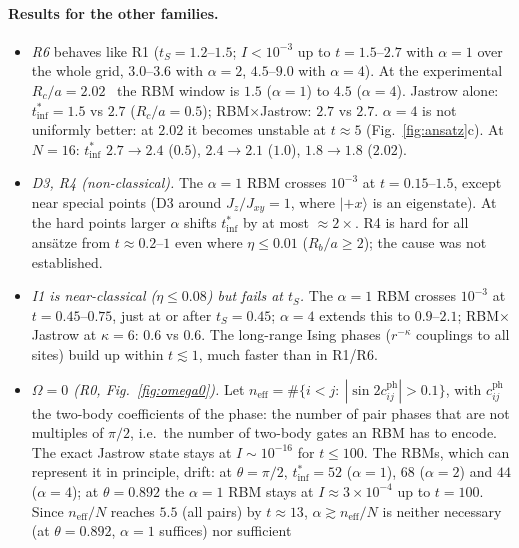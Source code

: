 \documentclass[11pt,a4paper]{article}
\newcommand{\inff}{I}
\newcommand{\tinf}{t^*_{\mathrm{inf}}}
\begin{document}
\paragraph{Results for the other families.}
\begin{itemize}
  \item \emph{R6} behaves like R1 ($t_S=1.2$--$1.5$; $\inff<10^{-3}$ up to $t=1.5$--$2.7$ with $\alpha=1$ over the
    whole grid, $3.0$--$3.6$ with $\alpha=2$, $4.5$--$9.0$ with $\alpha=4$). At the experimental
    $R_c/a=2.02$~\cite{Zeiher16} the RBM window is $1.5$ ($\alpha=1$) to $4.5$ ($\alpha=4$). Jastrow alone: $\tinf=1.5$
    vs $2.7$ ($R_c/a=0.5$); RBM$\times$Jastrow: $2.7$ vs $2.7$. $\alpha=4$ is not uniformly better: at $2.02$ it
    becomes unstable at $t\approx5$ (Fig.~\ref{fig:ansatz}c). At $N=16$: $\tinf$ $2.7\to2.4$ ($0.5$), $2.4\to2.1$
    ($1.0$), $1.8\to1.8$ ($2.02$).
  \item \emph{D3, R4 (non-classical).} The $\alpha=1$ RBM crosses $10^{-3}$ at $t=0.15$--$1.5$, except near special
    points (D3 around $J_z/J_{xy}=1$, where $|{+}x\rangle$ is an eigenstate). At the hard points larger $\alpha$ shifts
    $\tinf$ by at most $\approx2\times$. R4 is hard for all ansätze from $t\approx0.2$--$1$ even where $\eta\le0.01$
    ($R_b/a\ge2$); the cause was not established.
  \item \emph{I1 is near-classical ($\eta\le0.08$) but fails at $t_S$.} The $\alpha=1$ RBM crosses $10^{-3}$ at
    $t=0.45$--$0.75$, just at or after $t_S=0.45$; $\alpha=4$ extends this to $0.9$--$2.1$; RBM$\times$Jastrow at
    $\kappa=6$: $0.6$ vs $0.6$. The long-range Ising phases ($r^{-\kappa}$ couplings to all sites) build up within
    $t\lesssim1$, much faster than in R1/R6.
  \item \emph{$\Omega=0$ (R0, Fig.~\ref{fig:omega0}).} Let $n_{\mathrm{eff}}=\#\{i<j:\ |\sin2c^{\mathrm{ph}}_{ij}|>0.1\}$,
    with $c^{\mathrm{ph}}_{ij}$ the two-body coefficients of the phase: the number of pair phases that are not
    multiples of $\pi/2$, i.e.\ the number of two-body gates an RBM has to encode. The exact Jastrow state stays at
    $\inff\sim10^{-16}$ for $t\le100$. The RBMs, which can represent it in principle, drift: at $\theta=\pi/2$,
    $\tinf=52$ ($\alpha=1$), $68$ ($\alpha=2$) and $44$ ($\alpha=4$); at $\theta=0.892$ the $\alpha=1$ RBM stays at
    $\inff\approx3\times10^{-4}$ up to $t=100$. Since $n_{\mathrm{eff}}/N$ reaches $5.5$ (all pairs) by $t\approx13$,
    $\alpha\gtrsim n_{\mathrm{eff}}/N$ is neither necessary (at $\theta=0.892$, $\alpha=1$ suffices) nor sufficient

\end{itemize}
\end{document}
